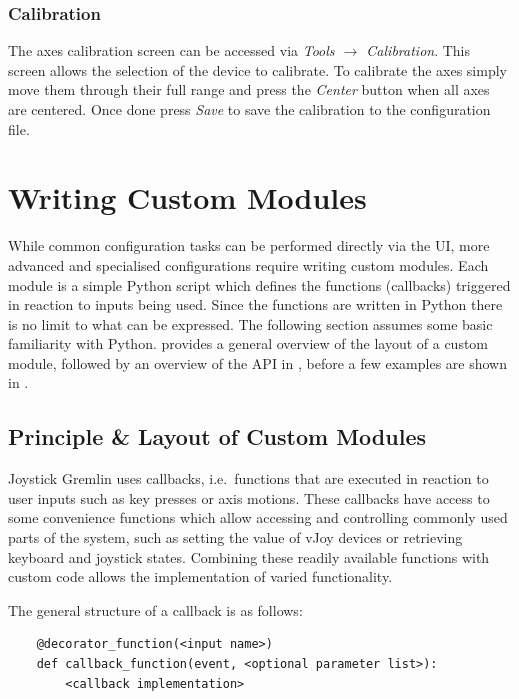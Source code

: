 \documentclass[a4, 10pt]{article}
\begin{document}
\subsubsection{Calibration}

The axes calibration screen can be accessed via \emph{Tools
$\rightarrow$ Calibration}. This screen allows the selection of the
device to calibrate. To calibrate the axes simply move them through
their full range and press the \emph{Center} button when all axes are
centered. Once done press \emph{Save} to save the calibration to the
configuration file.



\section{Writing Custom Modules}
\label{sec:custom_modules}

While common configuration tasks can be performed directly via the UI,
more advanced and specialised configurations require writing custom
modules. Each module is a simple Python script which defines the
functions (callbacks) triggered in reaction to inputs being used. Since
the functions are written in Python there is no limit to what can be
expressed. The following section assumes some basic familiarity with
Python.  provides a general overview of the layout
of a custom module, followed by an overview of the API in
, before a few examples are shown in
.


\subsection{Principle \& Layout of Custom Modules}
\label{sec:cm_principles}

Joystick Gremlin uses callbacks, i.e.\ functions that are executed in
reaction to user inputs such as key presses or axis motions. These
callbacks have access to some convenience functions which allow
accessing and controlling commonly used parts of the system, such as
setting the value of vJoy devices or retrieving keyboard and joystick
states. Combining these readily available functions with custom code
allows the implementation of varied functionality.

The general structure of a callback is as follows:
\begin{verbatim}
    @decorator_function(<input name>)
    def callback_function(event, <optional parameter list>):
        <callback implementation>
\end{verbatim}
\end{document}
